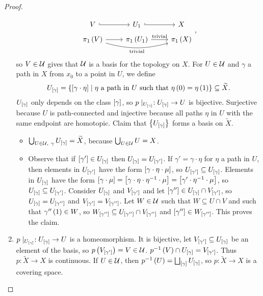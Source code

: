\begin{proof}
\begin{enumerate}
$$
\begin{tikzcd}[row sep=tiny]
V \arrow[hookrightarrow]{r} & U_1 \arrow[hookrightarrow]{r} & X \\
\pi_1\rb{V} \arrow{r} \arrow[bend right=15, swap]{rr}{\text{trivial}} & \pi_1\rb{U_1} \arrow{r}{\text{trivial}} & \pi_1\rb{X}
\end{tikzcd},
$$
so $ V \in \UU $ gives that $ \UU $ is a basis for the topology on $ X $. For $ U \in \UU $ and $ \gamma $ a path in $ X $ from $ x_0 $ to a point in $ U $, we define
$$ U_{\sb{\gamma}} = \cb{\sb{\gamma \cdot \eta} \mid \eta \ \text{a path in} \ U \ \text{such that} \ \eta\rb{0} = \eta\rb{1}} \subseteq \widetilde{X}. $$
$ U_{\sb{\gamma}} $ only depends on the class $ \sb{\gamma} $, so $ p \mid_{U_{\sb{\gamma}}} : U_{\sb{\gamma}} \to U $ is bijective. Surjective because $ U $ is path-connected and injective because all paths $ \eta $ in $ U $ with the same endpoint are homotopic. Claim that $ \cb{U_{\sb{\gamma}}} $ forms a basis on $ \widetilde{X} $.
\begin{itemize}
\item $ \bigcup_{U \in \UU, \ \gamma} U_{\sb{\gamma}} = \widetilde{X} $, because $ \bigcup_{U \in \UU} U = X $.
\item Observe that if $ \sb{\gamma'} \in U_{\sb{\gamma}} $ then $ U_{\sb{\gamma}} = U_{\sb{\gamma'}} $. If $ \gamma' = \gamma \cdot \eta $ for $ \eta $ a path in $ U $, then elements in $ U_{\sb{\gamma'}} $ have the form $ \sb{\gamma \cdot \eta \cdot \mu} $, so $ U_{\sb{\gamma'}} \subseteq U_{\sb{\gamma}} $. Elements in $ U_{\sb{\gamma}} $ have the form $ \sb{\gamma \cdot \mu} = \sb{\gamma \cdot \eta \cdot \eta^{-1} \cdot \mu} = \sb{\gamma' \cdot \eta^{-1} \cdot \mu} $, so $ U_{\sb{\gamma}} \subseteq U_{\sb{\gamma'}} $. Consider $ U_{\sb{\gamma}} $ and $ V_{\sb{\gamma'}} $ and let $ \sb{\gamma''} \in U_{\sb{\gamma}} \cap V_{\sb{\gamma'}} $, so $ U_{\sb{\gamma}} = U_{\sb{\gamma''}} $ and $ V_{\sb{\gamma'}} = V_{\sb{\gamma''}} $. Let $ W \in \UU $ such that $ W \subseteq U \cap V $ and such that $ \gamma''\rb{1} \in W $, so $ W_{\sb{\gamma''}} \subseteq U_{\sb{\gamma''}} \cap V_{\sb{\gamma''}} $ and $ \sb{\gamma''} \in W_{\sb{\gamma''}} $. This proves the claim.
\end{itemize}
\item $ p \mid_{U_{\sb{\gamma}}} : U_{\sb{\gamma}} \to U $ is a homeomorphism. It is bijective, let $ V_{\sb{\gamma'}} \subseteq U_{\sb{\gamma}} $ be an element of the basis, so $ p\rb{V_{\sb{\gamma'}}} = V \in \UU $. $ p^{-1}\rb{V} \cap U_{\sb{\gamma}} = V_{\sb{\gamma'}} $. Thus $ p : \widetilde{X} \to X $ is continuous. If $ U \in \UU $, then $ p^{-1}\rb{U} = \bigsqcup_{\sb{\gamma}} U_{\sb{\gamma}} $, so $ p : \widetilde{X} \to X $ is a covering space.
\end{enumerate}
\end{proof}

